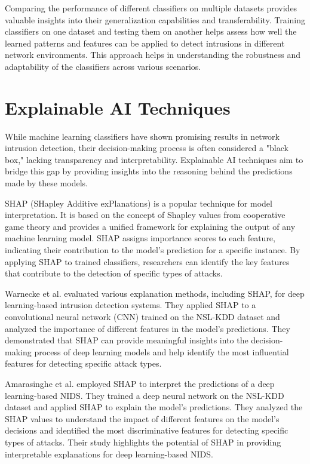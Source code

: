 Comparing the performance of different classifiers on multiple datasets provides valuable insights into their generalization capabilities and transferability. Training classifiers on one dataset and testing them on another helps assess how well the learned patterns and features can be applied to detect intrusions in different network environments. This approach helps in understanding the robustness and adaptability of the classifiers across various scenarios.

\section{Explainable AI Techniques}

While machine learning classifiers have shown promising results in network intrusion detection, their decision-making process is often considered a "black box," lacking transparency and interpretability. Explainable AI techniques aim to bridge this gap by providing insights into the reasoning behind the predictions made by these models.

SHAP (SHapley Additive exPlanations) \cite{lundberg2017unified} is a popular technique for model interpretation. It is based on the concept of Shapley values from cooperative game theory and provides a unified framework for explaining the output of any machine learning model. SHAP assigns importance scores to each feature, indicating their contribution to the model's prediction for a specific instance. By applying SHAP to trained classifiers, researchers can identify the key features that contribute to the detection of specific types of attacks.

Warnecke et al. \cite{warnecke2020evaluating} evaluated various explanation methods, including SHAP, for deep learning-based intrusion detection systems. They applied SHAP to a convolutional neural network (CNN) trained on the NSL-KDD dataset and analyzed the importance of different features in the model's predictions. They demonstrated that SHAP can provide meaningful insights into the decision-making process of deep learning models and help identify the most influential features for detecting specific attack types.

Amarasinghe et al. \cite{amarasinghe2018toward} employed SHAP to interpret the predictions of a deep learning-based NIDS. They trained a deep neural network on the NSL-KDD dataset and applied SHAP to explain the model's predictions. They analyzed the SHAP values to understand the impact of different features on the model's decisions and identified the most discriminative features for detecting specific types of attacks. Their study highlights the potential of SHAP in providing interpretable explanations for deep learning-based NIDS.

